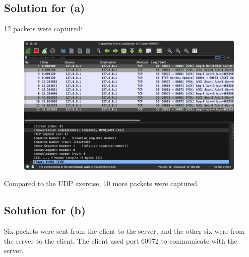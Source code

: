 \documentclass{scrartcl}
\begin{document}
\subsection{Solution for (a)}
12 packets were captured:

\begin{figure}[H]
  \centering
  \includegraphics[width=0.8\linewidth]{prob4a}
\end{figure}

Compared to the UDP exercise, 10 more packets were captured.

\subsection{Solution for (b)}
Six packets were sent from the client to the server, and the other six were
from the server to the client. The client used port 60972 to communicate with
the server.
\end{document}

